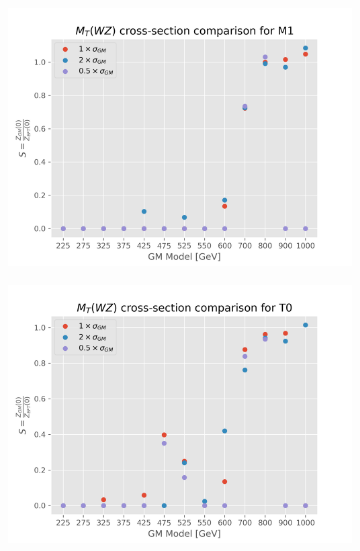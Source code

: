 \documentclass[../Bachelorarbeit.tex]{subfiles}
\begin{document}
\begin{figure}[h]
\begin{subfigure}{0.45\textwidth}
    \end{subfigure}
    \begin{subfigure}{0.45\textwidth}
        \includegraphics[width=\textwidth]{Plots/gm_relevanze/MWZ_comparision_M1.png}

    \end{subfigure}
    \begin{subfigure}{0.45\textwidth}
        \includegraphics[width=\textwidth]{Plots/gm_relevanze/MWZ_comparision_T0.png}


\end{subfigure}
\end{figure}
\end{document}
